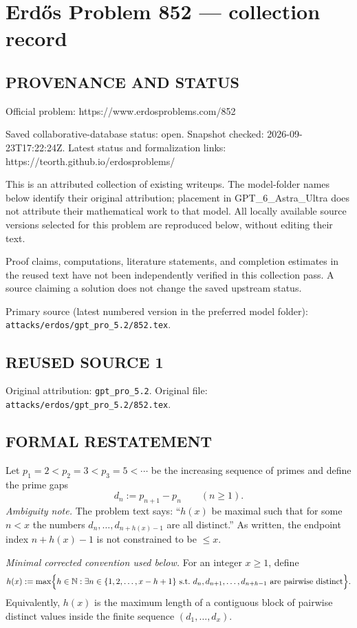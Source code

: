 \section*{Erd\H{o}s Problem 852 --- collection record}

\subsection*{PROVENANCE AND STATUS}
Official problem: https://www.erdosproblems.com/852

Saved collaborative-database status: open.
Snapshot checked: 2026-09-23T17:22:24Z.
Latest status and formalization links: https://teorth.github.io/erdosproblems/

This is an attributed collection of existing writeups. The model-folder names below identify their original attribution; placement in GPT\_6\_Astra\_Ultra does not attribute their mathematical work to that model. All locally available source versions selected for this problem are reproduced below, without editing their text.

Proof claims, computations, literature statements, and completion estimates in the reused text have not been independently verified in this collection pass. A source claiming a solution does not change the saved upstream status.

Primary source (latest numbered version in the preferred model folder): \texttt{attacks/erdos/gpt\_pro\_5.2/852.tex}.

\subsection*{REUSED SOURCE 1}
Original attribution: \texttt{gpt\_pro\_5.2}.
Original file: \texttt{attacks/erdos/gpt\_pro\_5.2/852.tex}.



\subsection*{FORMAL RESTATEMENT}
Let $p_1=2<p_2=3<p_3=5<\cdots$ be the increasing sequence of primes and define the prime gaps
\[
  d_n := p_{n+1}-p_n \qquad (n\ge 1).
\]
\emph{Ambiguity note.} The problem text says: ``$h(x)$ be maximal such that for some $n<x$ the numbers $d_n,\ldots,d_{n+h(x)-1}$ are all distinct.''  As written, the endpoint index $n+h(x)-1$ is not constrained to be $\le x$.

\emph{Minimal corrected convention used below.} For an integer $x\ge 1$, define
\[
  h(x) := \max\Bigl\{h\in\mathbb{N}: \exists n\in\{1,2,\dots,x-h+1\}\ \text{s.t.}\ d_n,d_{n+1},\dots,d_{n+h-1}\ \text{are pairwise distinct}\Bigr\}.
\]
Equivalently, $h(x)$ is the maximum length of a contiguous block of pairwise distinct values inside the finite sequence $(d_1,\dots,d_x)$.

